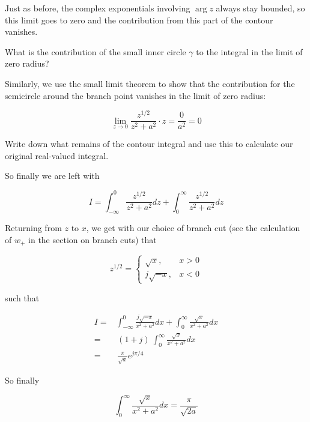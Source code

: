 Just as before, the complex exponentials involving $\arg z$ always stay bounded, so this limit goes to zero and the contribution from this part of the contour vanishes.

\begin{cue}
What is the contribution of the small inner circle $\gamma$ to the integral in the limit of zero radius?
\end{cue}

Similarly, we use the small limit theorem to show that the contribution for the semicircle around the branch point vanishes in the limit of zero radius:

\begin{equation}
\lim_{z \to 0}\frac{z^{1/2}}{z^2+a^2} \cdot z = \frac{0}{a^2} = 0
\end{equation}

\begin{cue}
Write down what remains of the contour integral and use this to calculate our original real-valued integral.
\end{cue}

So finally we are left with

\begin{equation}
I = \int_{- \infty}^{0}\frac{z^{1/2}}{z^2+a^2}dz + \int_{0}^{\infty}\frac{z^{1/2}}{z^2+a^2}dz
\end{equation} 

Returning from $z$ to $x$, we get with our choice of branch cut (see the calculation of $w_+$ in the section on branch cuts) that 

\begin{equation}
z^{1/2} = 
\begin{cases}
\sqrt{x}, & x > 0\\
j \sqrt{-x}, & x < 0
\end{cases}
\end{equation} 

such that

\begin{align}
I = & \int_{- \infty}^{0}\frac{j\sqrt{-x}}{x^2+a^2}dx +
\int_{0}^{\infty}\frac{\sqrt{x}}{x^2+a^2}dx \nonumber \\
 = & \, (1 + j) \ \int_{0}^{\infty}\frac{\sqrt{x}}{x^2+a^2}dx \nonumber \\
 = & \, \frac{\pi}{\sqrt{a}} e^{j \pi /4}
\end{align} 

So finally

\begin{equation}
\int_0^{\infty}\frac{\sqrt{x}}{x^2+a^2}dx = \frac{\pi}{\sqrt{2a}}
\end{equation}

